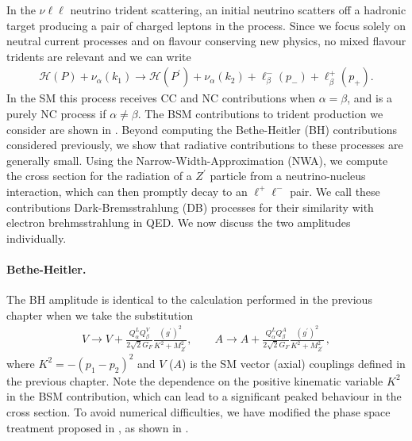In the $\nu \ell \ell$ neutrino trident scattering, an initial neutrino scatters off a hadronic target producing a pair of charged leptons in the process. Since we focus solely on neutral current processes and on flavour conserving new physics, no mixed flavour tridents are relevant and we can write 
%
\begin{align*} 
\mathcal{H} (P) + \nu_\alpha (k_1) \to \mathcal{H} (P^\prime) + \nu_\alpha (k_2)  + \ell^-_\beta (p_-) + \ell^+_\beta (p_+). 
\end{align*}
%
In the SM this process receives CC and NC contributions when $\alpha = \beta$, and is a purely NC process if $\alpha \neq \beta$. The BSM contributions to trident production we consider are shown in . Beyond computing the Bethe-Heitler (BH) contributions considered previously, we show that radiative contributions to these processes are generally small. Using the Narrow-Width-Approximation (NWA), we compute the cross section for the radiation of a $Z^\prime$ particle from a neutrino-nucleus interaction, which can then promptly decay to an $\ell^+\ell^-$ pair. We call these contributions Dark-Bremsstrahlung (DB) processes for their similarity with electron brehmsstrahlung in QED. We now discuss the two amplitudes individually.

\paragraph{Bethe-Heitler.} The BH amplitude is identical to the calculation performed in the previous chapter when we take the substitution
%
\begin{align}
V \to V +  \frac{Q_{\alpha}^L Q_{\beta}^V}{2\sqrt{2} G_{F}} \frac{(g^\prime)^2}{K^2 + M^2_{Z^\prime}}, \qquad
A \to A + \frac{Q_{\alpha}^L Q_{\beta}^A}{2\sqrt{2} G_{F}} \frac{(g^\prime)^2}{K^2 + M^2_{Z^\prime}}\,,
\label{eq:c_prescription_trident}
\end{align}
%
where $K^2 = -(p_1-p_2)^2$ and $V$ ($A$) is the SM vector (axial) couplings defined in the previous chapter. Note the dependence on the positive kinematic variable $K^2$ in the BSM contribution, which can lead to a significant peaked behaviour in the cross section. To avoid numerical difficulties, we have modified the phase space treatment proposed in \cite{Czyz1964,Lovseth1971}, as shown in . 

